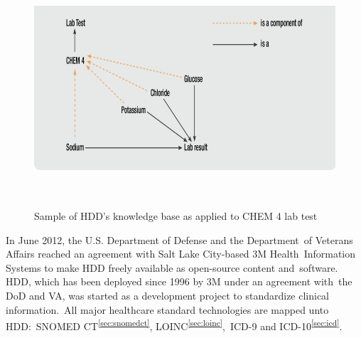   \begin{figure}[ht!]
      \label{fig:lab}
      \centering
      \includegraphics[scale=0.4]{labtest.png}
      \caption{Sample of HDD's knowledge base as applied to CHEM 4 lab test}\
      \citep{_3M_HDD_Product_Overview_2010}\
  \end{figure}
  
  \noindent In June 2012, the U.S. Department of Defense and the Department\
  of Veterans Affairs reached an agreement with Salt Lake City-based 3M Health\
  Information Systems to make HDD freely available as open-source content and\
  software. HDD, which has been deployed since 1996 by 3M under an agreement with\
  the DoD and VA, was started as a development project to standardize clinical information.\
  All major healthcare standard technologies are mapped unto HDD:\
  SNOMED CT\textsuperscript{\ref{sec:snomedct}}, LOINC\textsuperscript{\ref{sec:loinc}},\
  ICD-9 and ICD-10\textsuperscript{\ref{sec:icd}}. \citep{_DeGaspari_2013}\
 
